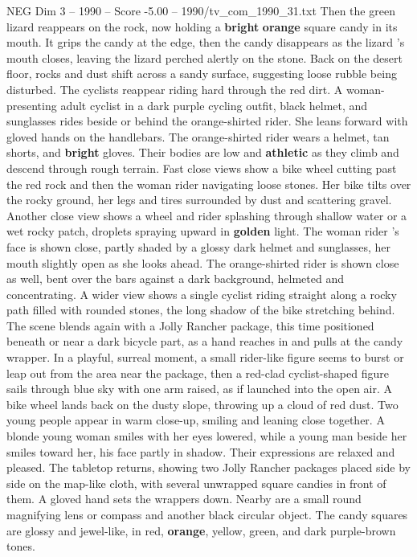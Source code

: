 \begin{textsample}{NEG Dim 3 – 1990 – Score -5.00 – 1990/tv\_com\_1990\_31.txt}
Then the green lizard reappears on the rock, now holding a \textbf{bright} \textbf{orange} square candy in its mouth.
It grips the candy at the edge, then the candy disappears as the lizard ’s mouth closes, leaving the lizard perched alertly on the stone.
Back on the desert floor, rocks and dust shift across a sandy surface, suggesting loose rubble being disturbed.
The cyclists reappear riding hard through the red dirt.
A woman-presenting adult cyclist in a dark purple cycling outfit, black helmet, and sunglasses rides beside or behind the orange-shirted rider.
She leans forward with gloved hands on the handlebars.
The orange-shirted rider wears a helmet, tan shorts, and \textbf{bright} gloves.
Their bodies are low and \textbf{athletic} as they climb and descend through rough terrain.
Fast close views show a bike wheel cutting past the red rock and then the woman rider navigating loose stones.
Her bike tilts over the rocky ground, her legs and tires surrounded by dust and scattering gravel.
Another close view shows a wheel and rider splashing through shallow water or a wet rocky patch, droplets spraying upward in \textbf{golden} light.
The woman rider ’s face is shown close, partly shaded by a glossy dark helmet and sunglasses, her mouth slightly open as she looks ahead.
The orange-shirted rider is shown close as well, bent over the bars against a dark background, helmeted and concentrating.
A wider view shows a single cyclist riding straight along a rocky path filled with rounded stones, the long shadow of the bike stretching behind.
The scene blends again with a Jolly Rancher package, this time positioned beneath or near a dark bicycle part, as a hand reaches in and pulls at the candy wrapper.
In a playful, surreal moment, a small rider-like figure seems to burst or leap out from the area near the package, then a red-clad cyclist-shaped figure sails through blue sky with one arm raised, as if launched into the open air.
A bike wheel lands back on the dusty slope, throwing up a cloud of red dust.
Two young people appear in warm close-up, smiling and leaning close together.
A blonde young woman smiles with her eyes lowered, while a young man beside her smiles toward her, his face partly in shadow.
Their expressions are relaxed and pleased.
The tabletop returns, showing two Jolly Rancher packages placed side by side on the map-like cloth, with several unwrapped square candies in front of them.
A gloved hand sets the wrappers down.
Nearby are a small round magnifying lens or compass and another black circular object.
The candy squares are glossy and jewel-like, in red, \textbf{orange}, yellow, green, and dark purple-brown tones.

\end{textsample}
